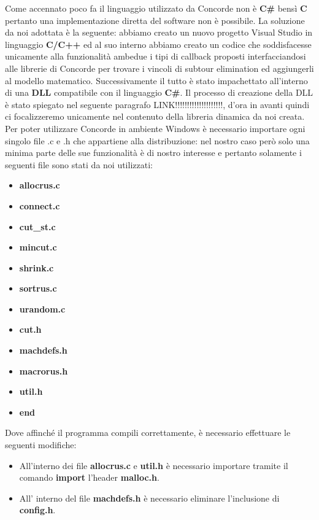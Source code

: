 \documentclass[11pt]{article}
\begin{document}
Come accennato poco fa il linguaggio utilizzato da Concorde non è \textbf{C\#} bensì \textbf{C} pertanto una implementazione diretta del software non è possibile. La soluzione da noi adottata è la seguente: abbiamo creato un nuovo progetto Visual Studio in linguaggio \textbf{C/C++} ed al suo interno abbiamo creato un codice che soddisfacesse unicamente alla funzionalità ambedue i tipi di callback proposti interfacciandosi alle librerie di Concorde per trovare i vincoli di subtour elimination ed aggiungerli al modello matematico. Successivamente il tutto è stato impachettato all'interno di una \textbf{DLL} compatibile con il linguaggio \textbf{C\#}. Il processo di creazione della DLL è stato spiegato nel seguente paragrafo LINK!!!!!!!!!!!!!!!!!!!!, d'ora in avanti quindi ci focalizzeremo unicamente nel contenuto della libreria dinamica da noi creata.\\

Per poter utilizzare Concorde in ambiente Windows è necessario importare ogni singolo file .c e .h che appartiene alla distribuzione: nel nostro caso però solo una minima parte delle sue funzionalità è di nostro interesse e pertanto solamente i seguenti file sono stati da noi utilizzati:


\begin{itemize}
    \item \textbf{allocrus.c}
    \item \textbf{connect.c}
    \item \textbf{cut\_st.c}
    \item \textbf{mincut.c}
    \item \textbf{shrink.c}
    \item \textbf{sortrus.c}
    \item \textbf{urandom.c}
    \item \textbf{cut.h}
    \item \textbf{machdefs.h}
    \item \textbf{macrorus.h}
    \item \textbf{util.h}
    \item \textbf{end}
\end{itemize}

Dove affinché il programma compili correttamente, è necessario effettuare le seguenti modifiche:

\begin{itemize}
    \item All'interno dei file \textbf{allocrus.c} e \textbf{util.h} è necessario importare tramite il comando \textbf{import} l'header \textbf{malloc.h}.
    \item All' interno del file \textbf{machdefs.h} è necessario eliminare l'inclusione di \textbf{config.h}.
\end{itemize}
\end{document}
